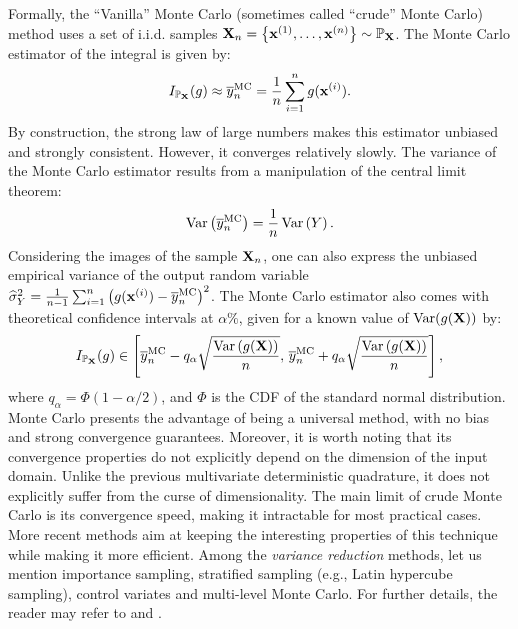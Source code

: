 Formally, the ``Vanilla'' Monte Carlo (sometimes called ``crude'' Monte Carlo) method uses a set of i.i.d. samples ${\bf X}_n = \left\{{\bf x}^{(1)}, \dots, {\bf x}^{(n)}\right\} \sim \mathbb{P}_{{\bf X}}$. 
The Monte Carlo estimator of the integral is given by: 
\begin{equation}
    I_{\mathbb{P}_{{\bf X}}}(g) \approx \overline{y}_n^{\textrm{MC}} = \frac1n \sum_{i=1}^{n} g({\bf x}^{(i)}).
\end{equation}
By construction, the strong law of large numbers makes this estimator unbiased and strongly consistent. 
However, it converges relatively slowly. 
The variance of the Monte Carlo estimator results from a manipulation of the central limit theorem:
\begin{equation}
    \operatorname{Var}\left(\overline{y}_n^{\textrm{MC}}\right) = \frac{1}{n} \operatorname{Var}\left(Y\right). 
    \label{eq:MC_variance}
\end{equation}
Considering the images of the sample ${\bf X}_n$, one can also express the unbiased empirical variance of the output random variable $\widehat{\sigma}^2_Y = \frac{1}{n-1} \sum_{i=1}^n \left(g({\bf x}^{(i)}) - \overline{y}_n^{\textrm{MC}}\right)^2$.
The Monte Carlo estimator also comes with theoretical confidence intervals at $\alpha \%$, given for a known value of $\operatorname{Var}(g({\bf X}))$ by: 
\begin{equation}
    I_{\mathbb{P}_{{\bf X}}}(g) \in \left[\overline{y}_n^{\textrm{MC}}  - q_\alpha \sqrt{\frac{\operatorname{Var}\left(g({\bf X})\right)}{n}}, \, \overline{y}_n^{\textrm{MC}}  + q_\alpha \sqrt{\frac{\operatorname{Var}\left(g({\bf X})\right)}{n}} \right],
    \label{eq:MC_IC}
\end{equation}
where $q_\alpha = \Phi(1 - \alpha/2)$, and $\Phi$ is the CDF of the standard normal distribution. 
Monte Carlo presents the advantage of being a universal method, with no bias and strong convergence guarantees. 
Moreover, it is worth noting that its convergence properties do not explicitly depend on the dimension of the input domain. 
Unlike the previous multivariate deterministic quadrature, it does not explicitly suffer from the curse of dimensionality. 
The main limit of crude Monte Carlo is its convergence speed, making it intractable for most practical cases. 
More recent methods aim at keeping the interesting properties of this technique while making it more efficient. 
Among the \textit{variance reduction} methods, let us mention importance sampling, stratified sampling (e.g., Latin hypercube sampling), control variates and multi-level Monte Carlo. 
For further details, the reader may refer to \citet[Chap. 8,9,10]{owen_2013} and \citep{giles_2008}.


